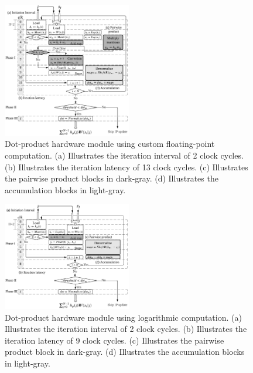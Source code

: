 \begin{figure}[h!]
	\centering
	\includegraphics[width=0.5\textwidth]{../figures/dot_product.pdf}
	\caption{Dot-product hardware module using custom floating-point computation. (a) Illustrates the iteration interval of 2 clock cycles. (b) Illustrates the iteration latency of 13 clock cycles. (c) Illustrates the pairwise product blocks in dark-gray. (d) Illustrates the accumulation blocks in light-gray.}
	\label{fig:dot_product_custom}
\end{figure}

\begin{figure}[h!]
	\centering
	\includegraphics[width=0.5\textwidth]{../figures/dot_product_log.pdf}
	\caption{Dot-product hardware module using logarithmic computation. (a) Illustrates the iteration interval of 2 clock cycles. (b) Illustrates the iteration latency of 9 clock cycles. (c) Illustrates the pairwise product block in dark-gray. (d) Illustrates the accumulation blocks in light-gray.}
	\label{fig:dot_product_log}
\end{figure}


